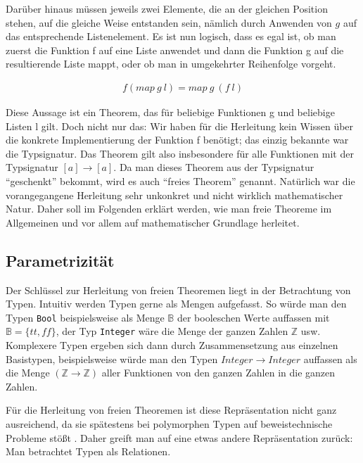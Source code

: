 Darüber hinaus müssen jeweils zwei Elemente, die an der gleichen Position stehen, auf die gleiche Weise entstanden sein, nämlich
durch Anwenden von $g$ auf das entsprechende Listenelement.
Es ist nun logisch, dass es egal ist, ob man zuerst die Funktion f auf eine Liste anwendet und dann die Funktion g auf die
resultierende Liste mappt, oder ob man in umgekehrter Reihenfolge vorgeht.

\begin{align}
f (map\ g\ l) = map\ g\ (f\ l)
\end{align}

Diese Aussage ist ein Theorem, das für beliebige Funktionen g und beliebige Listen l gilt. Doch nicht nur das: Wir haben für
die Herleitung kein Wissen über die konkrete Implementierung der Funktion f benötigt; das einzig bekannte war die Typsignatur.
Das Theorem gilt also insbesondere für alle Funktionen mit der Typsignatur $[a] \rightarrow [a]$. Da man dieses Theorem
aus der Typsignatur ``geschenkt'' bekommt, wird es auch ``freies Theorem'' genannt.
Natürlich war die vorangegangene Herleitung sehr unkonkret und nicht wirklich mathematischer Natur. Daher soll im Folgenden
erklärt werden, wie man freie Theoreme im Allgemeinen und vor allem auf mathematischer Grundlage herleitet.


\subsection{Parametrizität}

Der Schlüssel zur Herleitung von freien Theoremen liegt in der Betrachtung von Typen.
Intuitiv werden Typen gerne als Mengen aufgefasst. So würde man den Typen \texttt{Bool} beispielsweise als Menge $\mathbb{B}$
der booleschen Werte auffassen mit $\mathbb{B} = \{ tt, ff \}$, der Typ \texttt{Integer} wäre die Menge der ganzen Zahlen
$\mathbb{Z}$ usw. Komplexere Typen ergeben sich dann durch Zusammensetzung aus einzelnen Basistypen, beispielsweise
würde man den Typen \texttt{$Integer \rightarrow Integer$} auffassen als die Menge $(\mathbb{Z} \rightarrow \mathbb{Z})$ aller Funktionen von den ganzen Zahlen in die ganzen Zahlen.

Für die Herleitung von freien Theoremen ist diese Repräsentation nicht ganz ausreichend, da sie spätestens bei polymorphen
Typen auf beweistechnische Probleme stößt . Daher greift man auf eine etwas andere Repräsentation zurück: Man
betrachtet Typen als Relationen.

